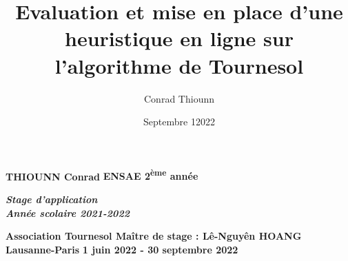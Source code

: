 \documentclass[hidelinks, 12pt]{article}
\title{Evaluation et mise en place d'une heuristique en ligne sur l'algorithme de Tournesol }
\author{
Conrad Thiounn }
\date{Septembre 12022}
\begin{document}
%
%
%

\begin{titlingpage}
\noindent
\textbf{\Large{THIOUNN Conrad}} \hfill
\textbf{\Large{ENSAE 2\textsuperscript{ème} année}} 
\begin{flushright}
\begin{minipage}{5.4cm}
\begin{center}
\textbf{\emph{\large{Stage d'application \\
Année scolaire 2021-2022 }}} 
\end{center}
\end{minipage}
\end{flushright}

\vspace{8cm}

\hspace*{-\parindent}%

\vspace{8cm}

\noindent \textbf{\Large{Association Tournesol \hfill Maître de stage : Lê-Nguyên HOANG \\ 
\hspace{20mm} Lausanne-Paris}} \hfill \textbf{\large{1 juin 2022 - 30 septembre 2022}}

\end{titlingpage}



\renewcommand*\contentsname{Table des matières}
\tableofcontents

\setlength\parskip{0.2 em} %
\end{document}
